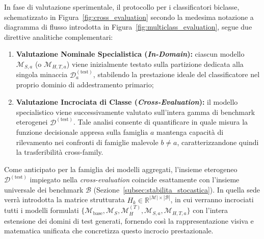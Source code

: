 In fase di valutazione sperimentale, il protocollo per i classificatori biclasse, schematizzato in Figura~\ref{fig:cross_evaluation} secondo la medesima notazione a diagramma di flusso introdotta in Figura~\ref{fig:multiclass_evaluation}, segue due direttive analitiche complementari:
\begin{enumerate}
    \item \textbf{Valutazione Nominale Specialistica (\textit{In-Domain}):} ciascun modello $\mathcal{M}_{S, a}$ (o $\mathcal{M}_{H, T, a}$) viene inizialmente testato sulla partizione dedicata alla singola minaccia $\mathcal{D}_a^{(\text{test})}$, stabilendo la prestazione ideale del classificatore nel proprio dominio di addestramento primario;
    \item \textbf{Valutazione Incrociata di Classe (\textit{Cross-Evaluation}):} il modello specialistico viene successivamente valutato sull'intera gamma di benchmark eterogenei $\mathcal{D}^{(\text{test})}$. Tale analisi consente di quantificare in quale misura la funzione decisionale appresa sulla famiglia $a$ mantenga capacità di rilevamento nei confronti di famiglie malevole $b\neq a$, caratterizzandone quindi la trasferibilità cross-family.
\end{enumerate}

Come anticipato per la famiglia dei modelli aggregati, l'insieme eterogeneo $\mathcal{D}^{(\text{test})}$ impiegato nella \textit{cross-evaluation} coincide esattamente con l'insieme universale dei benchmark $\mathcal{B}$ (Sezione~\ref{subsec:stabilita_stocastica}). In quella sede verrà introdotta la matrice strutturata $H_k \in \mathbb{R}^{|\mathcal{M}|\times|\mathcal{B}|}$, in cui verranno incrociati tutti i modelli formulati $\{\mathcal{M}_{\text{base}}, \mathcal{M}_S, \mathcal{M}_H^{(T)}, \mathcal{M}_{S,a}, \mathcal{M}_{H,T,a}\}$ con l'intera estensione dei domini di test generati, fornendo così la rappresentazione visiva e matematica unificata che concretizza questo incrocio prestazionale.

